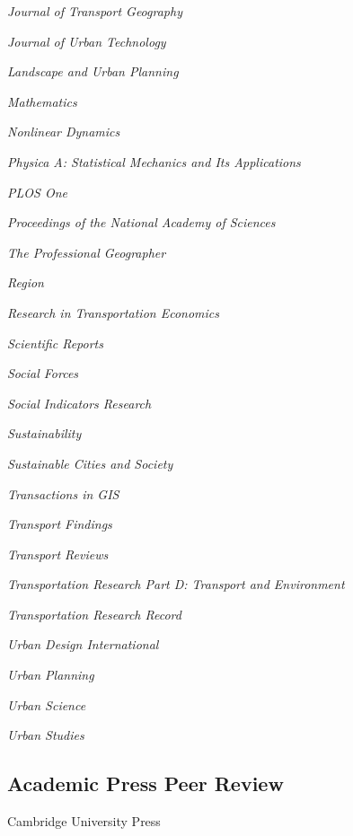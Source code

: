 \documentclass[12pt,letterpaper]{report}
\newcommand{\listitemspace}{0.25em}
\renewenvironment{itemize}
{\begin{list}{}{\setlength{\leftmargin}{0em}
                \setlength{\parskip}{0em}
                \setlength{\itemsep}{\listitemspace}
                \setlength{\parsep}{\listitemspace}}}
{\end{list}}
\begin{document}
\begin{itemize}
        \item \textit{Journal of Transport Geography}
        \item \textit{Journal of Urban Technology}
        \item \textit{Landscape and Urban Planning}
        \item \textit{Mathematics}
        \item \textit{Nonlinear Dynamics}
        \item \textit{Physica A: Statistical Mechanics and Its Applications}
        \item \textit{PLOS One}
        \item \textit{Proceedings of the National Academy of Sciences}
        \item \textit{The Professional Geographer}
        \item \textit{Region}
        \item \textit{Research in Transportation Economics}
        \item \textit{Scientific Reports}
        \item \textit{Social Forces}
        \item \textit{Social Indicators Research}
        \item \textit{Sustainability}
        \item \textit{Sustainable Cities and Society}
        \item \textit{Transactions in GIS}
        \item \textit{Transport Findings}
        \item \textit{Transport Reviews}
        \item \textit{Transportation Research Part D: Transport and Environment}
        \item \textit{Transportation Research Record}
        \item \textit{Urban Design International}
        \item \textit{Urban Planning}
        \item \textit{Urban Science}
        \item \textit{Urban Studies}

    \end{itemize}

    \subsection*{Academic Press Peer Review}

    \begin{itemize}

        \item Cambridge University Press

    \end{itemize}
\end{document}
